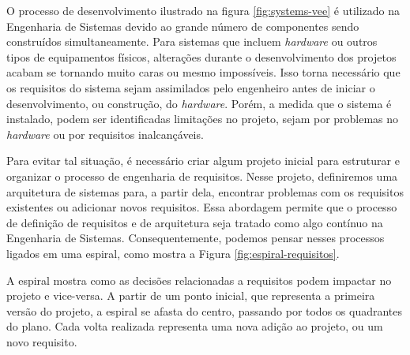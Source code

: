     O processo de desenvolvimento ilustrado na figura \ref{fig:systems-vee} é utilizado na Engenharia de Sistemas devido ao grande número de componentes sendo construídos simultaneamente. Para sistemas que incluem \textit{hardware} ou outros tipos de equipamentos físicos, alterações durante o desenvolvimento dos projetos acabam se tornando muito caras ou mesmo impossíveis. Isso torna necessário que os requisitos do sistema sejam assimilados pelo engenheiro antes de iniciar o desenvolvimento, ou construção, do \textit{hardware}. Porém, a medida que o sistema é instalado, podem ser identificadas limitações no projeto, sejam por problemas no \textit{hardware} ou por requisitos inalcançáveis. 

    Para evitar tal situação, é necessário criar algum projeto inicial para estruturar e organizar o processo de engenharia de requisitos. Nesse projeto, definiremos uma arquitetura de sistemas para, a partir dela, encontrar problemas com os requisitos existentes ou adicionar novos requisitos. Essa abordagem permite que o processo de definição de requisitos e de arquitetura seja tratado como algo contínuo na Engenharia de Sistemas. Consequentemente, podemos pensar nesses processos ligados em uma espiral, como mostra a Figura \ref{fig:espiral-requisitos}.
    
    \begin{figure}[h!]
        \centering
    \end{figure}
     
    A espiral mostra como as decisões relacionadas a requisitos podem impactar no projeto e vice-versa. A partir de um ponto inicial, que representa a primeira versão do projeto, a espiral se afasta do centro, passando por todos os quadrantes do plano. Cada volta realizada representa uma nova adição ao projeto, ou um novo requisito.  
    
